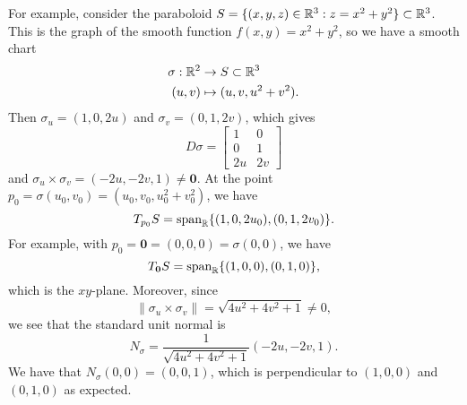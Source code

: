 For example, consider the paraboloid $S = \{(x, y, z) \in \mathbb{R}^3 : z = x^2 + y^2\}
\subset \mathbb{R}^3$. This is the graph of the smooth function $f(x, y) = x^2 + y^2$, so 
we have a smooth chart 
\begin{align*}
    \sigma : \mathbb{R}^2 &\to S \subset \mathbb{R}^3 \\ 
    (u, v) &\mapsto (u, v, u^2 + v^2). 
\end{align*}
Then $\sigma_u = (1, 0, 2u)$ and $\sigma_v = (0, 1, 2v)$, which gives 
\[ D\sigma = \begin{bmatrix}
    1 & 0 \\ 
    0 & 1 \\ 
    2u & 2v 
\end{bmatrix} \] 
and $\sigma_u \times \sigma_v = (-2u, -2v, 1) \neq \mathbf 0$. At the point
$p_0 = \sigma(u_0, v_0) = (u_0, v_0, u_0^2+v_0^2)$, we have 
\[ T_{p_0}S = \operatorname{span}_{\mathbb{R}}\{(1, 0, 2u_0), (0, 1, 2v_0)\}. \] 
For example, with $p_0 = \mathbf 0 = (0, 0, 0) = \sigma(0, 0)$, we have 
\[ T_{\mathbf 0} S = \operatorname{span}_{\mathbb{R}}\{(1, 0, 0), (0, 1, 0)\}, \] 
which is the $xy$-plane. Moreover, since 
\[ \|\sigma_u \times \sigma_v\| = \sqrt{4u^2 + 4v^2 + 1} \neq 0, \] 
we see that the standard unit normal is 
\[ N_\sigma = \frac{1}{\sqrt{4u^2 + 4v^2 + 1}} (-2u, -2v, 1). \] 
We have that $N_\sigma(0, 0) = (0, 0, 1)$, which is perpendicular 
to $(1, 0, 0)$ and $(0, 1, 0)$ as expected. \newpage 

